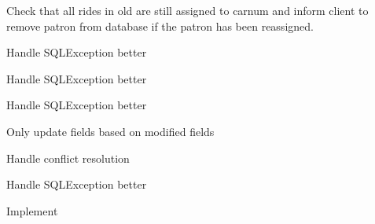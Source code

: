 \begin{DoxyRefList}
Check that all rides in old are still assigned to carnum and inform client to remove patron from database if the patron has been reassigned. 

Handle S\-Q\-L\-Exception better  
\item[\label{todo__todo000012}%
\hypertarget{todo__todo000012}{}%
Member \hyperlink{classMySQLConn_a8ffe3e96eb70c795c4ade821e70dd6bf}{My\-S\-Q\-L\-Conn\-:\-:get\-Location\-I\-D} (std\-::string loc)]Handle S\-Q\-L\-Exception better  
\item[\label{todo__todo000011}%
\hypertarget{todo__todo000011}{}%
Member \hyperlink{classMySQLConn_ae26fdad9114c884ff5b8bfefebee4254}{My\-S\-Q\-L\-Conn\-:\-:get\-Patron\-Info} (int pid, \hyperlink{classPatronList}{Patron\-List} $\ast$i\-\_\-apb\-Patl)]Handle S\-Q\-L\-Exception better  
\item[\label{todo__todo000008}%
\hypertarget{todo__todo000008}{}%
Member \hyperlink{classMySQLConn_a1653065e63d0dc420392b5694e688237}{My\-S\-Q\-L\-Conn\-:\-:set\-Updt} (int carnum, \hyperlink{classPatronList}{Patron\-List} $\ast$i\-\_\-apb\-Patl, \hyperlink{classRequest}{Request} $\ast$i\-\_\-a\-P\-B\-Req)]Only update fields based on modified fields 

Handle conflict resolution 

Handle S\-Q\-L\-Exception better  
\item[\label{todo__todo000005}%
\hypertarget{todo__todo000005}{}%
Member \hyperlink{classMySQLConn_a081f010ada91cd0d0f67ab8dddb5d8af}{My\-S\-Q\-L\-Conn\-:\-:store\-Car\-Info} (std\-::string ipaddr, int car)]Implement
\end{DoxyRefList}